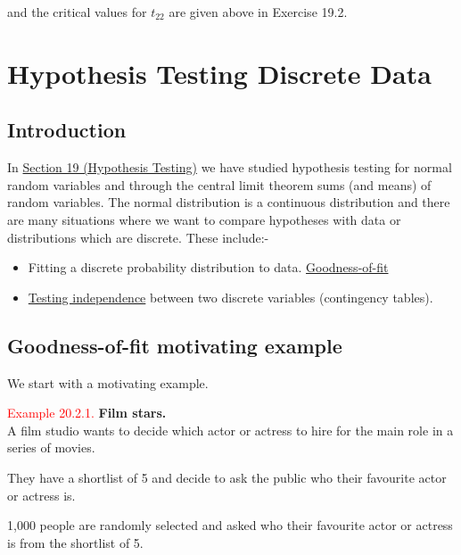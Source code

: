 \documentclass[
]{book}
\providecommand{\tightlist}{%
  \setlength{\itemsep}{0pt}\setlength{\parskip}{0pt}}
\begin{document}
and the critical values for \(t_{22}\) are given above in Exercise 19.2.

\hfill\break

\hypertarget{Hypo_Test_Discrete}{%
\chapter{Hypothesis Testing Discrete Data}\label{Hypo_Test_Discrete}}

\hypertarget{Hypo_Test_Discrete:intro}{%
\section{Introduction}\label{Hypo_Test_Discrete:intro}}

In \protect\hyperlink{Sec_Hypo_Test}{Section 19 (Hypothesis Testing)} we have studied hypothesis testing for normal random variables and through the central limit theorem sums (and means) of random variables. The normal distribution is a continuous distribution and there are many situations where we want to compare hypotheses with data or distributions which are discrete. These include:-

\begin{itemize}
\tightlist
\item
  Fitting a discrete probability distribution to data. \protect\hyperlink{Hypo_Test_Discrete:GoF}{Goodness-of-fit}
\item
  \protect\hyperlink{Hypo_Test_Discrete:Independence}{Testing independence} between two discrete variables (contingency tables).
\end{itemize}

\hypertarget{Hypo_Test_Discrete:motivate}{%
\section{Goodness-of-fit motivating example}\label{Hypo_Test_Discrete:motivate}}

We start with a motivating example.

\leavevmode{}%
\textcolor{red}{Example 20.2.1.}
{\textbf{Film stars.}}\\
A film studio wants to decide which actor or actress to hire for the main role in a series of movies.

They have a shortlist of 5 and decide to ask the public who their favourite actor or actress is.

1,000 people are randomly selected and asked who their favourite actor or actress is from the shortlist of 5.
\end{document}
